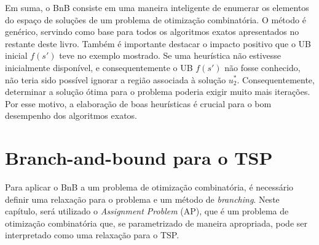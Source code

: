 {Em suma, o BnB consiste em uma maneira inteligente de enumerar os elementos do espaço de soluções de um problema de otimização combinatória. O método é genérico, servindo como base para todos os algoritmos exatos apresentados no restante deste livro. Também é importante destacar o impacto positivo que o UB inicial $f(s')$ teve no exemplo mostrado. Se uma heurística não estivesse inicialmente disponível, e consequentemente o UB $f(s')$ não fosse conhecido, não teria sido possível ignorar a região associada à solução $u^*_2$. Consequentemente, determinar a solução ótima para o problema poderia exigir muito mais iterações. Por esse motivo, a elaboração de boas heurísticas é crucial para o bom desempenho dos algoritmos exatos. 





\section{Branch-and-bound para o TSP}

Para aplicar o BnB a um problema de otimização combinatória, é necessário definir uma relaxação para o problema e um método de \textit{branching}. Neste capítulo, será utilizado o \textit{Assignment Problem} (AP), que é um problema de otimização combinatória que, se parametrizado de maneira apropriada, pode ser interpretado como uma relaxação para o TSP. 

}
